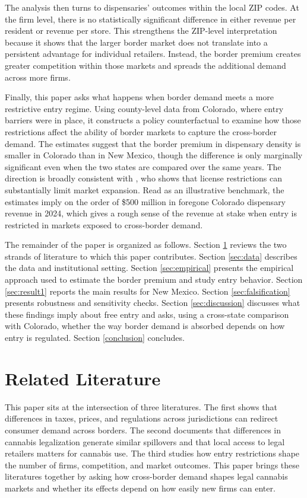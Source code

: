 \documentclass[12pt]{article}
\begin{document}
The analysis then turns to dispensaries' outcomes within the local ZIP codes. At the firm level, there is no statistically significant difference in either revenue per resident or revenue per store. This strengthens the ZIP-level interpretation because it shows that the larger border market does not translate into a persistent advantage for individual retailers. Instead, the border premium creates greater competition within those markets and spreads the additional demand across more firms.

Finally, this paper asks what happens when border demand meets a more restrictive entry regime. Using county-level data from Colorado, where entry barriers were in place, it constructs a policy counterfactual to examine how those restrictions affect the ability of border markets to capture the cross-border demand. The estimates suggest that the border premium in dispensary density is smaller in Colorado than in New Mexico, though the difference is only marginally significant even when the two states are compared over the same years. The direction is broadly consistent with \cite{thomas2019license}, who shows that license restrictions can substantially limit market expansion. Read as an illustrative benchmark, the estimates imply on the order of \$500 million in foregone Colorado dispensary revenue in 2024, which gives a rough sense of the revenue at stake when entry is restricted in markets exposed to cross-border demand.

The remainder of the paper is organized as follows. Section \ref{litreview} reviews the two strands of literature to which this paper contributes. Section \ref{sec:data} describes the data and institutional setting. Section \ref{sec:empirical} presents the empirical approach used to estimate the border premium and study entry behavior. Section \ref{sec:result1} reports the main results for New Mexico. Section \ref{sec:falsification} presents robustness and sensitivity checks. Section \ref{sec:discussion} discusses what these findings imply about free entry and asks, using a cross-state comparison with Colorado, whether the way border demand is absorbed depends on how entry is regulated. Section \ref{conclusion} concludes.

\section{Related Literature}
\label{litreview}

This paper sits at the intersection of three literatures. The first shows that differences in taxes, prices, and regulations across jurisdictions can redirect consumer demand across borders. The second documents that differences in cannabis legalization generate similar spillovers and that local access to legal retailers matters for cannabis use. The third studies how entry restrictions shape the number of firms, competition, and market outcomes. This paper brings these literatures together by asking how cross-border demand shapes legal cannabis markets and whether its effects depend on how easily new firms can enter.
\end{document}
